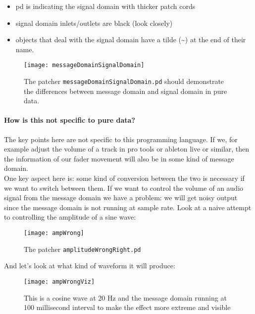 \begin{itemize}
	\item pd is indicating the signal domain with thicker patch cords
	\item signal domain inlets/outlets are black (look closely)
	\item objects that deal with the signal domain have a tilde (\textasciitilde ) at the end of their name.
\end{itemize}

\begin{figure}[h!]
	\centering
	\texttt{[image: messageDomainSignalDomain]}
	\caption[message domain vs. signal domain]
	{The patcher \texttt{messageDomainSignalDomain.pd} should demonstrate the differences between message domain and signal domain in pure data.}
	\label{fig:mesSig}
\end{figure}

\paragraph{How is this not specific to pure data?} The key points here are not specific to this programming language. If we, for example adjust the volume of a track in pro tools or ableton live or similar, then the information of our fader movement will also be in some kind of message domain.\\
One key aspect here is: some kind of conversion between the two is necessary if we want to switch between them. If we want to control the volume of an audio signal from the message domain we have a problem: we will get noisy output since the message domain is not running at sample rate. Look at a naive attempt to controlling the amplitude of a sine wave:

\begin{figure}[H]
	\centering
	\texttt{[image: ampWrong]}
	\caption[shortCaption]
	{The patcher \texttt{amplitudeWrongRight.pd} }
	\label{fig:label}
\end{figure}


And let's look at what kind of waveform it will produce:

\begin{figure}[H]
	\centering
	\texttt{[image: ampWrongViz]}
	\caption[shortCaption]
	{This is a cosine wave at 20 Hz and the message domain running at 100 millisecond interval to make the effect more extreme and visible}
	\label{fig:label}
\end{figure}


